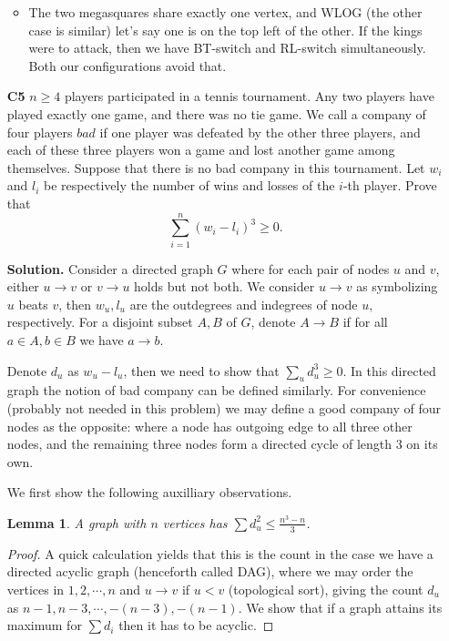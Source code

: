 \documentclass[11pt]{article}
\newcommand{\<}{\langle}
\renewcommand{\>}{\rangle}
\newtheorem{lemma}{Lemma}
\begin{document}
\begin{enumerate}
\begin{itemize}
		\item The two megasquares share exactly one vertex, and WLOG (the other case is similar) let's say one is on the top left of the other. If the kings were to attack, then we have BT-switch and RL-switch simultaneously. Both our configurations avoid that. 
	\end{itemize}

    \item [\textbf{C5}]
    	$n \geq 4$ players participated in a tennis tournament. Any two players have played exactly one game, and there was no tie game. We call a company of four players $bad$ if one player was defeated by the other three players, and each of these three players won a game and lost another game among themselves. Suppose that there is no bad company in this tournament. Let $w_i$ and $l_i$ be respectively the number of wins and losses of the $i$-th player. Prove that\[\sum^n_{i=1} \left(w_i - l_i\right)^3 \geq 0.\]
    	
    	\textbf{Solution.} 
    	Consider a directed graph $G$ where for each pair of nodes $u$ and $v$, 
    	either $u\to v$ or $v\to u$ holds but not both. 
    	We consider $u\to v$ as symbolizing $u$ beats $v$, 
    	then $w_u, l_u$ are the outdegrees and indegrees of node $u$, respectively. 
    	For a disjoint subset $A, B$ of $G$, denote $A\to B$ if for all $a\in A, b\in B$ we have $a\to b$. 
    	
    	Denote $d_u$ as $w_u-l_u$, then we need to show that $\sum_{u} d_u^3\ge 0$. 
    	In this directed graph the notion of bad company can be defined similarly. 
    	For convenience (probably not needed in this problem) we may define a good company of four nodes as the opposite: 
    	where a node has outgoing edge to all three other nodes, and the remaining three nodes form a directed cycle of length 3 on its own. 
    	
    	We first show the following auxilliary observations. 
    	\begin{lemma}\label{lmm:sq_deg}
    		A graph with $n$ vertices has $\sum d_u^2\le \frac{n^3 - n}{3}$. 
    	\end{lemma}
        
        \begin{proof}
        	A quick calculation yields that this is the count in the case we have a directed acyclic graph (henceforth called DAG), 
        	where we may order the vertices in $1, 2, \cdots, n$ and $u\to v$ if $u < v$ (topological sort), 
        	giving the count $d_u$ as $n - 1, n - 3, \cdots, -(n - 3), -(n - 1)$. 
        	We show that if a graph attains its maximum for $\sum d_i$ then it has to be acyclic. 
        	

\end{proof}
\end{enumerate}
\end{document}

